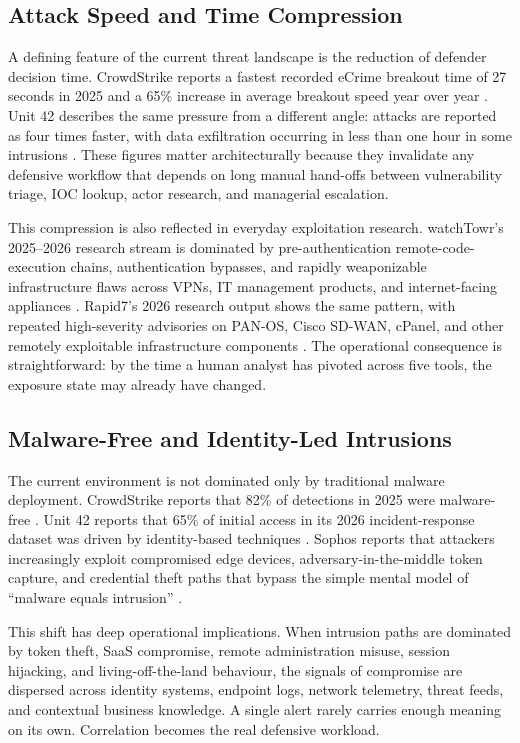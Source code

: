 \subsection{Attack Speed and Time Compression}
A defining feature of the current threat landscape is the reduction of defender decision time. CrowdStrike reports a fastest recorded eCrime breakout time of 27 seconds in 2025 and a 65\% increase in average breakout speed year over year \cite{crowdstrike_gtr_2026}. Unit 42 describes the same pressure from a different angle: attacks are reported as four times faster, with data exfiltration occurring in less than one hour in some intrusions \cite{unit42_ir_2026}. These figures matter architecturally because they invalidate any defensive workflow that depends on long manual hand-offs between vulnerability triage, IOC lookup, actor research, and managerial escalation.

This compression is also reflected in everyday exploitation research. watchTowr's 2025--2026 research stream is dominated by pre-authentication remote-code-execution chains, authentication bypasses, and rapidly weaponizable infrastructure flaws across VPNs, IT management products, and internet-facing appliances \cite{watchtowr_labs_2026}. Rapid7's 2026 research output shows the same pattern, with repeated high-severity advisories on PAN-OS, Cisco SD-WAN, cPanel, and other remotely exploitable infrastructure components \cite{rapid7_blog_2026}. The operational consequence is straightforward: by the time a human analyst has pivoted across five tools, the exposure state may already have changed.

\subsection{Malware-Free and Identity-Led Intrusions}
The current environment is not dominated only by traditional malware deployment. CrowdStrike reports that 82\% of detections in 2025 were malware-free \cite{crowdstrike_gtr_2026}. Unit 42 reports that 65\% of initial access in its 2026 incident-response dataset was driven by identity-based techniques \cite{unit42_ir_2026}. Sophos reports that attackers increasingly exploit compromised edge devices, adversary-in-the-middle token capture, and credential theft paths that bypass the simple mental model of ``malware equals intrusion'' \cite{sophos_threat_2025}.

This shift has deep operational implications. When intrusion paths are dominated by token theft, SaaS compromise, remote administration misuse, session hijacking, and living-off-the-land behaviour, the signals of compromise are dispersed across identity systems, endpoint logs, network telemetry, threat feeds, and contextual business knowledge. A single alert rarely carries enough meaning on its own. Correlation becomes the real defensive workload.

